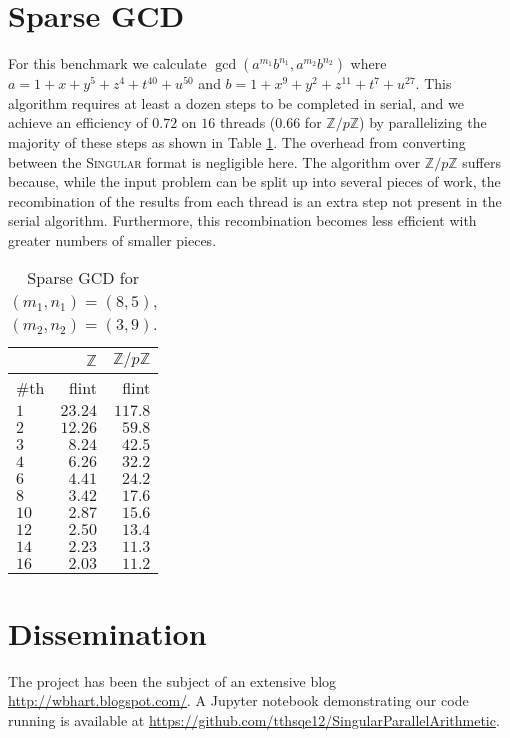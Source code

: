 \documentclass{deliverablereport}
\begin{document}
\section{Sparse GCD}
For this benchmark we calculate $\operatorname{gcd}(a^{m_1}b^{n_1}, a^{m_2}b^{n_2})$\text{,}
where $a=1+x+y^5+z^4+t^{40}+u^{50}$ and $b=1+x^9+y^2+z^{11}+t^7+u^{27}$. This algorithm requires at least a dozen steps to be completed in serial, and we achieve an efficiency of $0.72$ on $16$ threads ($0.66$ for $\mathbb{Z}/p\mathbb{Z}$) by parallelizing the majority of these steps as shown in Table \ref{table_sparse_gcd}. The overhead from converting between the \textsc{Singular} format is negligible here. The algorithm over $\mathbb{Z}/p\mathbb{Z}$ suffers because, while the input problem can be split up into several pieces of work, the recombination of the results from each thread is an extra step not present in the serial algorithm. Furthermore, this recombination becomes less efficient with greater numbers of smaller pieces.
\begin{table}
\begin{tabular}{l | r | r | }
 & $\mathbb{Z}$ & $\mathbb{Z}/p \mathbb{Z}$ \\ \hline
\#th   & flint & flint\\ \hline
$1$   & $23.24$ & $117.8$ \\ \hline
$2$   & $12.26$ & $59.8$ \\ \hline
$3$   & $8.24$  & $42.5$ \\ \hline
$4$   & $6.26$  & $32.2$ \\ \hline
$6$   & $4.41$  & $24.2$ \\ \hline
$8$   & $3.42$  & $17.6$ \\ \hline
$10$  & $2.87$  & $15.6$ \\ \hline
$12$  & $2.50$  & $13.4$ \\ \hline
$14$  & $2.23$  & $11.3$ \\ \hline
$16$  & $2.03$  & $11.2$ \\ \hline
\end{tabular}
\caption{Sparse GCD for $(m_1, n_1) = (8, 5)$, $(m_2, n_2) = (3, 9)$.}
\label{table_sparse_gcd}
\end{table}

\section{Dissemination}

The project has been the subject of an extensive blog \url{http://wbhart.blogspot.com/}. A Jupyter notebook demonstrating our code running is available at \url{https://github.com/tthsqe12/SingularParallelArithmetic}.
\end{document}
